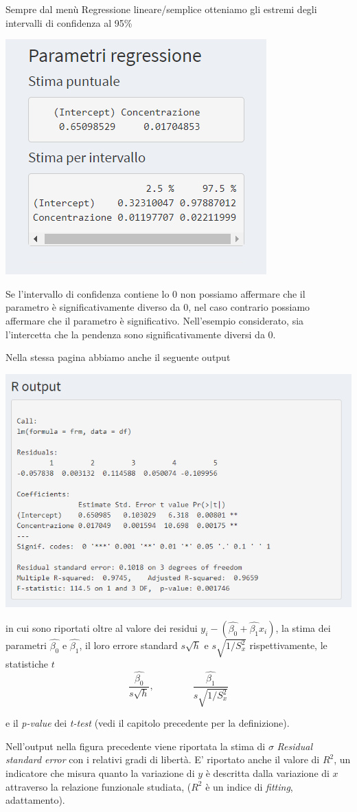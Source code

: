 \documentclass[
  11pt,
]{book}
\begin{document}
Sempre dal menù Regressione lineare/semplice otteniamo gli estremi degli intervalli di confidenza al 95\%

\begin{center}\includegraphics[width=0.5\linewidth]{Immagini/Regressione/06_stima_interv} \end{center}

Se l'intervallo di confidenza contiene lo 0 non possiamo affermare che il parametro è significativamente diverso da 0, nel caso contrario possiamo affermare che il parametro è significativo. Nell'esempio considerato, sia l'intercetta che la pendenza sono significativamente diversi da 0.

Nella stessa pagina abbiamo anche il seguente output

\begin{center}\includegraphics[width=0.5\linewidth]{Immagini/Regressione/07_R_output} \end{center}

in cui sono riportati oltre al valore dei residui \(y_i-(\hat{\beta_0}+\hat{\beta_1}x_i)\), la stima dei parametri \(\hat{\beta_0}\) e \(\hat{\beta_1}\), il loro errore standard \(s\sqrt{h}\) e \(s\sqrt{1/S^2_{x}}\) rispettivamente, le statistiche \(t\)
\[
\frac{\hat{\beta_0}}{s\sqrt{h}}, \qquad \qquad \frac{\hat{\beta_1}}{s\sqrt{1/S^2_{x}}}
\]

e il \emph{p-value} dei \emph{t-test} (vedi il capitolo precedente per la definizione).

Nell'output nella figura precedente viene riportata la stima di \(\sigma\) \emph{Residual standard error} con i relativi gradi di libertà. E' riportato anche il valore di \(R^2\), un indicatore che misura quanto la variazione di \(y\) è descritta dalla variazione di \(x\) attraverso la relazione funzionale studiata, (\(R^2\) è un indice di \emph{fitting}, adattamento).
\end{document}
